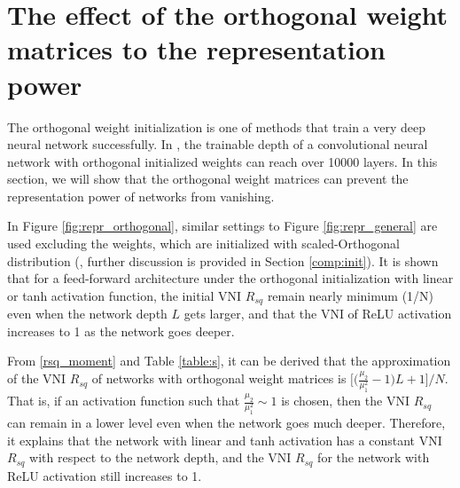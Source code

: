 

\section{The effect of the orthogonal weight matrices to the representation power} \label{repr_orthogonal}

The orthogonal weight initialization \cite{mft:linear} is one of methods that train a very
deep neural network successfully. In \cite{mft:cnn}, the trainable depth of a convolutional
neural network with orthogonal initialized weights can reach over 10000 layers. In this
section, we will show that the orthogonal weight matrices can prevent the representation
power of networks from vanishing.

In Figure \ref{fig:repr_orthogonal}, similar settings to Figure \ref{fig:repr_general} are 
used excluding the weights, which are initialized with scaled-Orthogonal distribution
(\cite{mft:linear}, further discussion is provided in Section \ref{comp:init}). It is shown
that for a feed-forward architecture under the orthogonal initialization with linear or tanh
activation function, the initial VNI $R_{sq}$ remain nearly
minimum (1/N) even when the network depth $L$ gets larger, and that the VNI of ReLU
activation increases to 1 as the network goes deeper.

From \eqref{rsq_moment} and Table \ref{table:s}, it can be derived that the approximation of
the VNI $R_{sq}$ of networks with orthogonal weight matrices is 
$\Big[\Big(\frac{\mu_2}{\mu_1^2}-1\Big)L+1\Big]\Big/N$. That is, if an activation function
such that $\frac{\mu_2}{\mu_1^2}\sim1$ is chosen, then the VNI $R_{sq}$ can remain
in a lower level even when the network goes much deeper. Therefore, it explains that the 
network with linear and tanh activation has a constant VNI $R_{sq}$ with respect to the
network depth, and the VNI $R_{sq}$ for the network with ReLU activation still increases
to 1.

